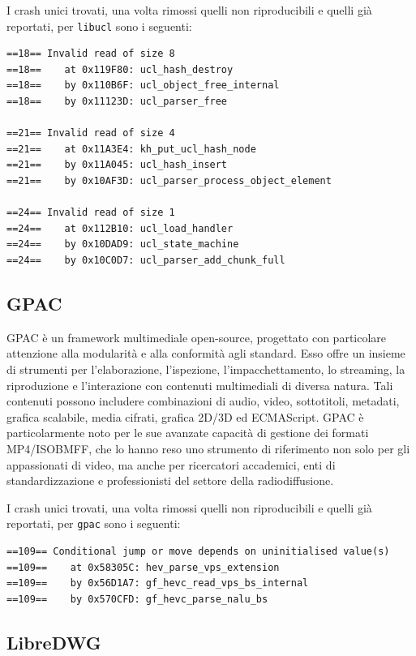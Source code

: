 I crash unici trovati, una volta rimossi quelli non riproducibili e quelli già reportati, per \texttt{libucl} sono i seguenti:

\begin{verbatim}
==18== Invalid read of size 8
==18==    at 0x119F80: ucl_hash_destroy 
==18==    by 0x110B6F: ucl_object_free_internal 
==18==    by 0x11123D: ucl_parser_free 

==21== Invalid read of size 4
==21==    at 0x11A3E4: kh_put_ucl_hash_node
==21==    by 0x11A045: ucl_hash_insert 
==21==    by 0x10AF3D: ucl_parser_process_object_element 

==24== Invalid read of size 1
==24==    at 0x112B10: ucl_load_handler 
==24==    by 0x10DAD9: ucl_state_machine 
==24==    by 0x10C0D7: ucl_parser_add_chunk_full 
\end{verbatim}

\subsection{GPAC}

GPAC è un framework multimediale open-source, progettato con particolare attenzione alla modularità e alla conformità agli standard. Esso offre un insieme di strumenti per l’elaborazione, l’ispezione, l’impacchettamento, lo streaming, la riproduzione e l’interazione con contenuti multimediali di diversa natura.
Tali contenuti possono includere combinazioni di audio, video, sottotitoli, metadati, grafica scalabile, media cifrati, grafica 2D/3D ed ECMAScript.
GPAC è particolarmente noto per le sue avanzate capacità di gestione dei formati MP4/ISOBMFF, che lo hanno reso uno strumento di riferimento non solo per gli appassionati di video, ma anche per ricercatori accademici, enti di standardizzazione e professionisti del settore della radiodiffusione.

I crash unici trovati, una volta rimossi quelli non riproducibili e quelli già reportati, per \texttt{gpac} sono i seguenti:

\begin{verbatim}
==109== Conditional jump or move depends on uninitialised value(s)
==109==    at 0x58305C: hev_parse_vps_extension 
==109==    by 0x56D1A7: gf_hevc_read_vps_bs_internal 
==109==    by 0x570CFD: gf_hevc_parse_nalu_bs 
\end{verbatim}


\subsection{LibreDWG}

